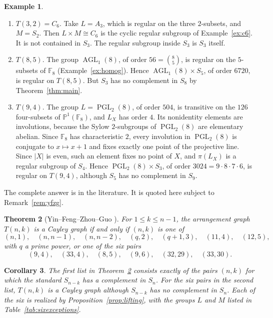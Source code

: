 \documentclass[12pt,letterpaper]{article}
\numberwithin{equation}{section}
\newtheorem{theorem}{Theorem}[section]
\newtheorem{corollary}[theorem]{Corollary}
\theoremstyle{definition}
\newtheorem{example}[theorem]{Example}
\DeclareMathOperator{\agll}{AGL}
\DeclareMathOperator{\pgll}{PGL}
\begin{document}
\begin{example}\label{ex:twisted}
\begin{enumerate}
\item $T(3,2)=C_6$. Take $L=A_3$, which is regular on the three $2$-subsets, and $M=S_2$. Then $L\times M\cong C_6$ is the cyclic regular subgroup of Example~\ref{ex:c6}. It is not contained in $S_3$. The regular subgroup inside $S_3$ is $S_3$ itself.
\item $T(8,5)$. The group $\agll_1(8)$, of order $56=\binom85$, is regular on the $5$-subsets of $\mathbb F_8$ (Example~\ref{ex:homog}). Hence $\agll_1(8)\times S_5$, of order $6720$, is regular on $T(8,5)$. But $S_3$ has no complement in $S_8$ by Theorem~\ref{thm:main}.
\item $T(9,4)$. The group $L=\pgll_2(8)$, of order $504$, is transitive on the $126$ four-subsets of $\mathbb P^1(\mathbb F_8)$, and $L_X$ has order $4$. Its nonidentity elements are involutions, because the Sylow $2$-subgroups of $\pgll_2(8)$ are elementary abelian. Since $\mathbb F_8$ has characteristic $2$, every involution in $\pgll_2(8)$ is conjugate to $x\mapsto x+1$ and fixes exactly one point of the projective line. Since $|X|$ is even, such an element fixes no point of $X$, and $\pi(L_X)$ is a regular subgroup of $S_4$. Hence $\pgll_2(8)\times S_3$, of order $3024=9\cdot8\cdot7\cdot6$, is regular on $T(9,4)$, although $S_5$ has no complement in $S_9$.
\end{enumerate}
\end{example}
The complete answer is in the literature. It is quoted here subject to Remark~\ref{rem:yfzg}.
\begin{theorem}[Yin--Feng--Zhou--Guo \cite{YFZG21}]\label{thm:yfzg}
For $1\leq k\leq n-1$, the arrangement graph $T(n,k)$ is a Cayley graph if and only if $(n,k)$ is one of
\[
(n,1),\quad(n,n-1),\quad(n,n-2),\quad(q,2),\quad(q+1,3),\quad(11,4),\quad(12,5),
\]
with $q$ a prime power, or one of the six pairs
\[
(9,4),\quad(33,4),\quad(8,5),\quad(9,6),\quad(32,29),\quad(33,30).
\]
\end{theorem}
\begin{corollary}\label{cor:converse}
The first list in Theorem~\ref{thm:yfzg} consists exactly of the pairs $(n,k)$ for which the standard $S_{n-k}$ has a complement in $S_n$. For the six pairs in the second list, $T(n,k)$ is a Cayley graph although $S_{n-k}$ has no complement in $S_n$. Each of the six is realized by Proposition~\ref{prop:lifting}, with the groups $L$ and $M$ listed in Table~\ref{tab:sixexceptions}.
\end{corollary}
\end{document}
